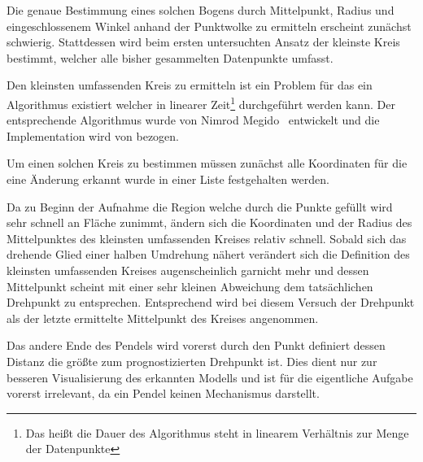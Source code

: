 Die genaue Bestimmung eines solchen Bogens durch Mittelpunkt, Radius und eingeschlossenem Winkel anhand der Punktwolke zu ermitteln erscheint zunächst schwierig.
Stattdessen wird beim ersten untersuchten Ansatz der kleinste Kreis bestimmt, welcher alle bisher gesammelten Datenpunkte umfasst.

Den kleinsten umfassenden Kreis zu ermitteln ist ein Problem für das ein Algorithmus existiert welcher in linearer Zeit\footnote{Das hei{\ss}t die Dauer des Algorithmus steht in linearem Verhältnis zur Menge der Datenpunkte} durchgeführt werden kann.
Der entsprechende Algorithmus wurde von Nimrod Megido~\cite{Megiddo1983} entwickelt und die Implementation wird von  bezogen.


Um einen solchen Kreis zu bestimmen müssen zunächst alle Koordinaten für die eine Änderung erkannt wurde in einer Liste festgehalten werden.

Da zu Beginn der Aufnahme die Region welche durch die Punkte gefüllt wird sehr schnell an Fläche zunimmt, ändern sich die Koordinaten und der Radius des Mittelpunktes des kleinsten umfassenden Kreises relativ schnell.
Sobald sich das drehende Glied einer halben Umdrehung nähert verändert sich die Definition des kleinsten umfassenden Kreises augenscheinlich garnicht mehr und dessen Mittelpunkt scheint mit einer sehr kleinen Abweichung dem tatsächlichen Drehpunkt zu entsprechen.
Entsprechend wird bei diesem Versuch der Drehpunkt als der letzte ermittelte Mittelpunkt des Kreises angenommen.

Das andere Ende des Pendels wird vorerst durch den Punkt definiert dessen Distanz die grö{\ss}te zum prognostizierten Drehpunkt ist.
Dies dient nur zur besseren Visualisierung des erkannten Modells und ist für die eigentliche Aufgabe vorerst irrelevant, da ein Pendel keinen Mechanismus darstellt.

